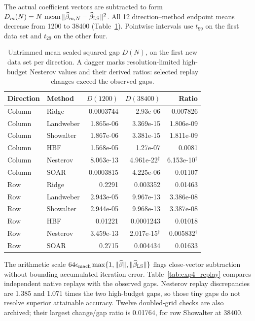 \documentclass[11pt,a4paper,leqno]{article}
\numberwithin{equation}{section}
\numberwithin{figure}{section}
\numberwithin{table}{section}
\theoremstyle{plain}
\theoremstyle{definition}
\theoremstyle{remark}
\begin{document}
The actual coefficient vectors are subtracted to form
$D_m(N)=N\,\operatorname{mean}\|\widehat\beta_{m,N}-\widehat\beta_{\rm LS}\|^2$.
All 12 direction--method endpoint means decrease from 1200 to 38400
(Table~\ref{tab:exp4_endpoints}). Pointwise intervals use $t_{99}$ on the
first data set and $t_{29}$ on the other four.

\begin{table}[!htbp]\centering\small
\caption{Untrimmed mean scaled squared gap $D(N)$, on the first new data set per direction. A dagger marks resolution-limited high-budget Nesterov values and their derived ratios: selected replay changes exceed the observed gaps.}
\label{tab:exp4_endpoints}
\begin{tabular}{llrrr}\toprule
Direction & Method & $D(1200)$ & $D(38400)$ & Ratio \\\midrule
Column & Ridge & 0.0003744 & 2.93e-06 & 0.007826 \\
Column & Landweber & 1.865e-06 & 3.369e-15 & 1.806e-09 \\
Column & Showalter & 1.867e-06 & 3.381e-15 & 1.811e-09 \\
Column & HBF & 1.568e-05 & 1.27e-07 & 0.0081 \\
Column & Nesterov & 8.063e-13 & 4.961e-22$^{\dagger}$ & 6.153e-10$^{\dagger}$ \\
Column & SOAR & 0.0003815 & 4.225e-06 & 0.01107 \\
Row & Ridge & 0.2291 & 0.003352 & 0.01463 \\
Row & Landweber & 2.943e-05 & 9.967e-13 & 3.386e-08 \\
Row & Showalter & 2.944e-05 & 9.968e-13 & 3.387e-08 \\
Row & HBF & 0.01221 & 0.0001243 & 0.01018 \\
Row & Nesterov & 3.459e-13 & 2.017e-15$^{\dagger}$ & 0.005832$^{\dagger}$ \\
Row & SOAR & 0.2715 & 0.004434 & 0.01633 \\
\bottomrule\end{tabular}
\end{table}


The arithmetic scale
$64\epsilon_{\rm mach}\max\{1,\|\widehat\beta\|,\|\widehat\beta_{\rm LS}\|\}$
flags close-vector subtraction without bounding accumulated iteration error.
Table~\ref{tab:exp4_replay} compares independent native replays with the
observed gaps. Nesterov replay discrepancies are 1.385 and 1.071 times
the two high-budget gaps, so those tiny gaps do not resolve superior
attainable accuracy. Twelve doubled-grid checks are also archived;
their largest change/gap ratio is 0.01764, for row Showalter at 38400.
\end{document}
